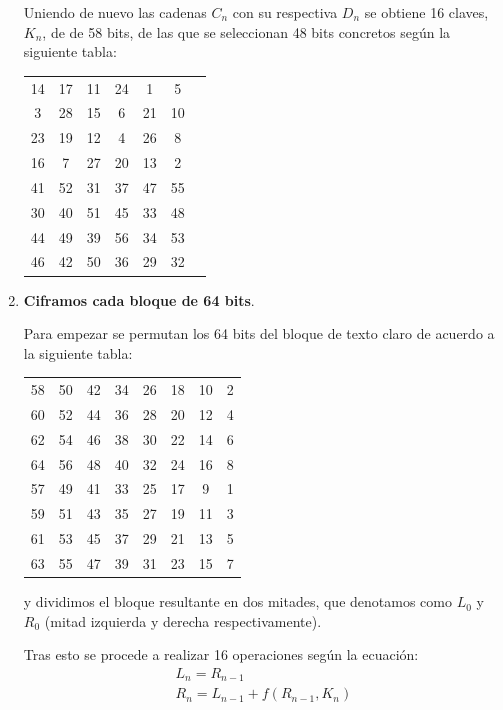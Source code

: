 \documentclass[nochap]{apuntesURJC}
\begin{document}
\begin{enumerate}
Uniendo de nuevo las cadenas $C_n$ con su respectiva $D_n$ se obtiene 16 claves, $K_n$, de de 58 bits, de las que se seleccionan 48 bits concretos según la siguiente tabla:

\begin{center}
\begin{tabular}{ccccccc}
14 &  17 &  11 & 24 &   1 &   5 \\
3  & 28  & 15  & 6  & 21  & 10 \\
23 &  19 &  12 &  4 &  26 &   8 \\
16 &   7 &  27 & 20 &  13 &   2 \\
41 &  52 &  31 & 37 &  47 &  55 \\
30 &  40 &  51 & 45 &  33 &  48 \\
44 &  49 &  39 & 56 &  34 &  53 \\
46 &  42 &  50 & 36 &  29 &  32
\end{tabular}
\end{center}

\item \textbf{Ciframos cada bloque de 64 bits}.

Para empezar se permutan los 64 bits del bloque de texto claro de acuerdo a la siguiente tabla:

\begin{center}
\begin{tabular}{cccccccc}
58 & 50 & 42 & 34 & 26 & 18 & 10 & 2\\
60 & 52 & 44 & 36 & 28 & 20 & 12 & 4\\
62 & 54 & 46 & 38 & 30 & 22 & 14 & 6\\
64 & 56 & 48 & 40 & 32 & 24 & 16 & 8\\
57 & 49 & 41 & 33 & 25 & 17 &  9 & 1\\
59 & 51 & 43 & 35 & 27 & 19 & 11 & 3\\
61 & 53 & 45 & 37 & 29 & 21 & 13 & 5\\
63 & 55 & 47 & 39 & 31 & 23 & 15 & 7
\end{tabular}
\end{center}

y dividimos el bloque resultante en dos mitades, que denotamos como $L_0$ y $R_0$ (mitad izquierda y derecha respectivamente).

Tras esto se procede a realizar 16 operaciones según la ecuación:
\[\begin{array}{l}
L_n = R_{n-1} \\
R_n = L_{n-1}+f(R_{n-1},K_n)
\end{array}\]


\end{enumerate}
\end{document}
